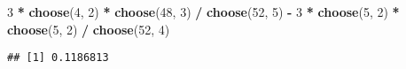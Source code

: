\documentclass[]{article}
\newenvironment{Shaded}{\begin{snugshade}}{\end{snugshade}}
\newcommand{\KeywordTok}[1]{\textcolor[rgb]{0.13,0.29,0.53}{\textbf{#1}}}
\newcommand{\DecValTok}[1]{\textcolor[rgb]{0.00,0.00,0.81}{#1}}
\newcommand{\StringTok}[1]{\textcolor[rgb]{0.31,0.60,0.02}{#1}}
\newcommand{\OperatorTok}[1]{\textcolor[rgb]{0.81,0.36,0.00}{\textbf{#1}}}
\newcommand{\NormalTok}[1]{#1}
\begin{document}
\begin{Shaded}
\begin{Highlighting}[]
\DecValTok{3} \OperatorTok{*}\StringTok{ }\KeywordTok{choose}\NormalTok{(}\DecValTok{4}\NormalTok{, }\DecValTok{2}\NormalTok{) }\OperatorTok{*}\StringTok{ }\KeywordTok{choose}\NormalTok{(}\DecValTok{48}\NormalTok{, }\DecValTok{3}\NormalTok{) }\OperatorTok{/}\StringTok{ }\KeywordTok{choose}\NormalTok{(}\DecValTok{52}\NormalTok{, }\DecValTok{5}\NormalTok{) }\OperatorTok{-}\StringTok{ }
\StringTok{  }\DecValTok{3} \OperatorTok{*}\StringTok{ }\KeywordTok{choose}\NormalTok{(}\DecValTok{5}\NormalTok{, }\DecValTok{2}\NormalTok{) }\OperatorTok{*}\StringTok{ }\KeywordTok{choose}\NormalTok{(}\DecValTok{5}\NormalTok{, }\DecValTok{2}\NormalTok{) }\OperatorTok{/}\StringTok{ }\KeywordTok{choose}\NormalTok{(}\DecValTok{52}\NormalTok{, }\DecValTok{4}\NormalTok{)}
\end{Highlighting}
\end{Shaded}

\begin{verbatim}
## [1] 0.1186813
\end{verbatim}
\end{document}
